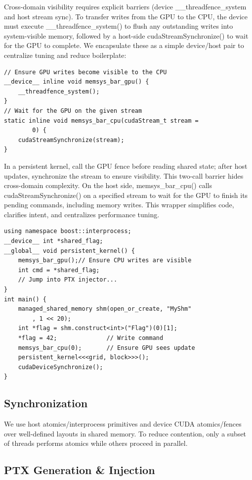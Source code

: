 Cross-domain visibility requires explicit barriers (device \_\_threadfence\_system and host stream sync). To transfer writes from the GPU to the CPU, the device must execute \_\_threadfence\_system() to flush any outstanding writes into system-visible memory, followed by a host-side cudaStreamSynchronize() to wait for the GPU to complete. We encapsulate these as a simple device/host pair to centralize tuning and reduce boilerplate:
\begin{verbatim}
// Ensure GPU writes become visible to the CPU
__device__ inline void memsys_bar_gpu() {
    __threadfence_system();
}
// Wait for the GPU on the given stream
static inline void memsys_bar_cpu(cudaStream_t stream =
        0) {
    cudaStreamSynchronize(stream);
}
\end{verbatim}
In a persistent kernel, call the GPU fence before reading shared state; after host updates, synchronize the stream to ensure visibility. This two-call barrier hides cross-domain complexity. On the host side, memsys\_bar\_cpu() calls cudaStreamSynchronize() on a specified stream to wait for the GPU to finish its pending commands, including memory writes. This wrapper simplifies code, clarifies intent, and centralizes performance tuning.
\begin{verbatim}
using namespace boost::interprocess;
__device__ int *shared_flag;
__global__ void persistent_kernel() {
    memsys_bar_gpu();// Ensure CPU writes are visible
    int cmd = *shared_flag;
    // Jump into PTX injector...
}
int main() {
    managed_shared_memory shm(open_or_create, "MyShm"
        , 1 << 20);
    int *flag = shm.construct<int>("Flag")(0)[1];
    *flag = 42;              // Write command
    memsys_bar_cpu(0);       // Ensure GPU sees update
    persistent_kernel<<<grid, block>>>();
    cudaDeviceSynchronize();
}
\end{verbatim}

\subsection{Synchronization}
We use host atomics/interprocess primitives and device CUDA atomics/fences over well-defined layouts in shared memory. To reduce contention, only a subset of threads performs atomics while others proceed in parallel.

\subsection{PTX Generation \& Injection}\label{sec:ptx_injection}

